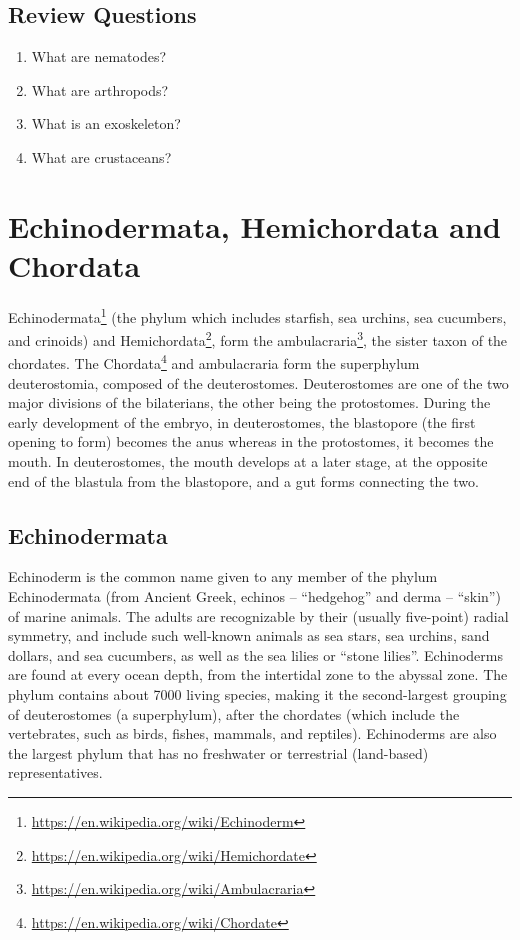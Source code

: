 \documentclass[]{book}
\providecommand{\tightlist}{%
  \setlength{\itemsep}{0pt}\setlength{\parskip}{0pt}}
\let\rmarkdownfootnote\footnote%
\def\footnote{\protect\rmarkdownfootnote}
\renewcommand{\href}[2]{#2\footnote{\url{#1}}}
\theoremstyle{definition}
\theoremstyle{definition}
\theoremstyle{definition}
\theoremstyle{remark}
\begin{document}
\section{Review Questions}\label{review-questions-5}

\begin{enumerate}
\def\labelenumi{\arabic{enumi}.}
\tightlist
\item
  What are nematodes?
\item
  What are arthropods?
\item
  What is an exoskeleton?
\item
  What are crustaceans?
\end{enumerate}

\chapter{Echinodermata, Hemichordata and
Chordata}\label{echinodermata-hemichordata-and-chordata}

\href{https://en.wikipedia.org/wiki/Echinoderm}{Echinodermata} (the
phylum which includes starfish, sea urchins, sea cucumbers, and
crinoids) and
\href{https://en.wikipedia.org/wiki/Hemichordate}{Hemichordata}, form
the \href{https://en.wikipedia.org/wiki/Ambulacraria}{ambulacraria}, the
sister taxon of the chordates. The
\href{https://en.wikipedia.org/wiki/Chordate}{Chordata} and ambulacraria
form the superphylum deuterostomia, composed of the deuterostomes.
Deuterostomes are one of the two major divisions of the bilaterians, the
other being the protostomes. During the early development of the embryo,
in deuterostomes, the blastopore (the first opening to form) becomes the
anus whereas in the protostomes, it becomes the mouth. In deuterostomes,
the mouth develops at a later stage, at the opposite end of the blastula
from the blastopore, and a gut forms connecting the two.

\section{Echinodermata}\label{echinodermata}

Echinoderm is the common name given to any member of the phylum
Echinodermata (from Ancient Greek, echinos -- ``hedgehog'' and derma --
``skin'') of marine animals. The adults are recognizable by their
(usually five-point) radial symmetry, and include such well-known
animals as sea stars, sea urchins, sand dollars, and sea cucumbers, as
well as the sea lilies or ``stone lilies''. Echinoderms are found at
every ocean depth, from the intertidal zone to the abyssal zone. The
phylum contains about 7000 living species, making it the second-largest
grouping of deuterostomes (a superphylum), after the chordates (which
include the vertebrates, such as birds, fishes, mammals, and reptiles).
Echinoderms are also the largest phylum that has no freshwater or
terrestrial (land-based) representatives.
\end{document}

